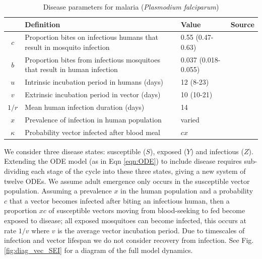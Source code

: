 \begin{table}[t]
\caption[Malaria disease parameters.]{Disease parameters for malaria (\textit{Plasmodium falciparum})}%
\vspace{.1cm}
\centering %
\begin{tabular}{|c|p{74mm}|p{32mm}|c|}%
\hline                        %
 & Definition & Value & Source \\ [0.5ex]%
\hline                  %
$c$ & Proportion bites on infectious humans that result in mosquito infection & 0.55 (0.47-0.63) & \cite{Smith2010} \\
$b$ & Proportion bites from infectious mosquitoes that result in human infection & 0.037 (0.018-0.055) & \cite{Killeen2000} \\
$u$ & Intrinsic incubation period in humans (days) & 12 (8-23) & \cite{Boyd1937} \\
$v$ & Extrinsic incubation period in vector (days) & 10 (10-21) & \cite{Gary2001}\\
$1/r$ & Mean human infection duration (days) & 14 & \cite{CDCMalaria} \\
$x$ & Prevalence of infection in human population & varied & \\
$\kappa$ & Probability  vector infected after blood meal & $cx$ & \\
[1ex]      %
\hline%
\end{tabular}
\label{table:param_malaria}%
\end{table}

We consider three disease states: susceptible ($S$), exposed ($Y$) and infectious ($Z$). Extending the ODE model (as in Eqn \ref{eqn:ODE}) to include disease requires sub-dividing each stage of the cycle into these three states, giving a new system of twelve ODEs. We assume adult emergence only occurs in the susceptible vector population. Assuming a prevalence $x$ in the human population and a probability $c$ that a vector becomes infected after biting an infectious human, then a proportion $xc$ of susceptible vectors moving from blood-seeking to fed become exposed to disease; all exposed mosquitoes can become infected, this occurs at rate $1/v$ where $v$ is the average vector incubation period. Due to timescales of infection and vector lifespan we do not consider recovery from infection. See Fig. \ref{fig:diag_vec_SEI} for a diagram of the full model dynamics.

